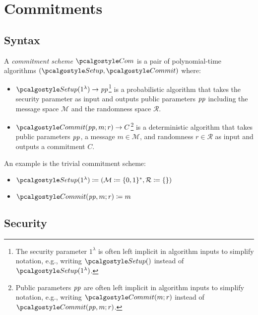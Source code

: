 \section{Commitments}\label{sec:commitments}

\subsection{Syntax}
\begin{definition}
  A \emph{commitment scheme} $\algo{Com}$ is a pair of polynomial-time algorithms $(\algo{Setup}, \algo{Commit})$ where:
  \begin{itemize}
    \item $\algo{Setup}(1^\lambda) \rightarrow \params$\footnote{The security parameter $1^\lambda$ is often left implicit in algorithm inputs to simplify notation, e.g., writing $\algo{Setup}()$ instead of $\algo{Setup}(1^\lambda)$.} is a probabilistic algorithm that takes the security parameter as input and outputs public parameters $\mathit{pp}$ including the message space $\mathcal{M}$ and the randomness space $\mathcal{R}$.
    \item $\algo{Commit}(\params, m; r) \rightarrow C$\footnote{Public parameters $\mathit{pp}$ are often left implicit in algorithm inputs to simplify notation, e.g., writing $\algo{Commit}(m; r)$ instead of $\algo{Commit}(\params, m; r)$.} is a deterministic algorithm that takes public parameters $\mathit{pp}$, a message $m \in \mathcal{M}$, and randomness $r \in \mathcal{R}$ as input and outputs a commitment $C$.
  \end{itemize}
\end{definition}

\begin{example}
  An example is the trivial commitment scheme\label{sec:trivial-com}:
  \begin{itemize}
    \item $\algo{Setup}(1^\lambda) \defeq (\mathcal{M} \defeq \{0, 1\}^*, \mathcal{R} \defeq \{\})$
    \item $\algo{Commit}(\params,m;r) \defeq m$
  \end{itemize}
\end{example}

\subsection{Security}

